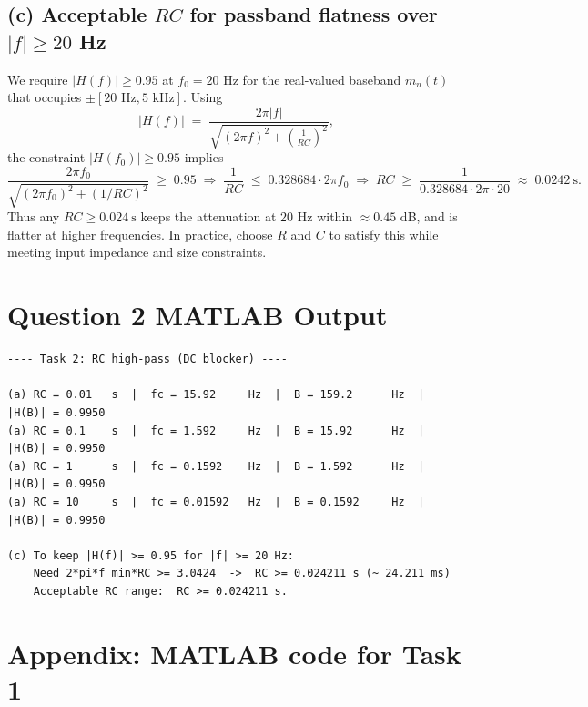 \documentclass[11pt]{article}
\begin{document}
\subsection*{(c) Acceptable \(RC\) for passband flatness over \(\lvert f \rvert \ge 20\) Hz}
We require \(|H(f)| \ge 0.95\) at \(f_0=20\) Hz for the real-valued baseband \(m_n(t)\) that occupies \(\pm[20\text{ Hz}, 5\text{ kHz}]\).
Using
\[
|H(f)| \;=\; \frac{2\pi |f|}{\sqrt{(2\pi f)^2 + \left(\tfrac{1}{RC}\right)^2}},
\]
the constraint \(|H(f_0)| \ge 0.95\) implies
\[
\frac{2\pi f_0}{\sqrt{(2\pi f_0)^2 + (1/RC)^2}} \;\ge\; 0.95
\;\Rightarrow\;
\frac{1}{RC} \;\le\; 0.328684\cdot 2\pi f_0
\;\Rightarrow\;
RC \;\ge\; \frac{1}{0.328684\cdot 2\pi \cdot 20} \;\approx\; \boxed{0.0242\ \text{s}}.
\]
Thus any \(\boxed{RC \ge 0.024\ \text{s}}\) keeps the attenuation at \(20\) Hz within \(\approx 0.45\) dB, and is flatter at higher frequencies. In practice, choose \(R\) and \(C\) to satisfy this while meeting input impedance and size constraints.

\section*{Question 2 MATLAB Output}

\begin{lstlisting}[style=mcode,caption={Task 2 MATLAB Command Window Output}]
---- Task 2: RC high-pass (DC blocker) ----

(a) RC = 0.01   s  |  fc = 15.92     Hz  |  B = 159.2      Hz  |  |H(B)| = 0.9950
(a) RC = 0.1    s  |  fc = 1.592     Hz  |  B = 15.92      Hz  |  |H(B)| = 0.9950
(a) RC = 1      s  |  fc = 0.1592    Hz  |  B = 1.592      Hz  |  |H(B)| = 0.9950
(a) RC = 10     s  |  fc = 0.01592   Hz  |  B = 0.1592     Hz  |  |H(B)| = 0.9950

(c) To keep |H(f)| >= 0.95 for |f| >= 20 Hz:
    Need 2*pi*f_min*RC >= 3.0424  ->  RC >= 0.024211 s (~ 24.211 ms)
    Acceptable RC range:  RC >= 0.024211 s.
\end{lstlisting}

\section*{Appendix: MATLAB code for Task 1}
\end{document}
